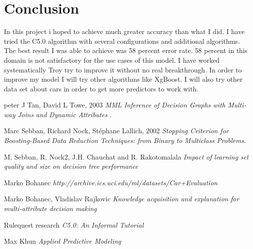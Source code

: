 \documentclass[a4paper, 12pt]{article}
\begin{document}
\section{Conclusion}
In this project i hoped to achieve much greater accuracy than what I did. I have tried the C5.0 algorithm with several configurations and additional algorithms. The best result I was able to achieve was 58 percent error rate. 58 percent in this domain is not satisfactory for the use cases of this model. I have worked systematically Troy try to improve it without no real breakthrough. In order to improve my model I will try other algorithms like XgBoost. I will also try other data set about cars in order to get more predictors to work with. 
\clearpage
\begin{thebibliography}{9}
peter J Tan, David L Towe, 2003
\textit{MML Inference of Decision Graphs with Multi-way Joins and Dynamic Attributes
}.

  Marc Sebban, Richard Nock, Stéphane Lallich, 2002
  \textit{Stopping Criterion for Boosting-Based Data Reduction Techniques: from Binary to Multiclass Problems}.

  M. Sebban, R. Nock2, J.H. Chauchat and R. Rakotomalala
  \textit{Impact of learning set quality and size on decision tree performance}

  Marko Bohanec
  \textit{http://archive.ics.uci.edu/ml/datasets/Car+Evaluation}

  Marko Bohanec, Vladislav Rajkovic
  \textit{Knowledge acquisition and explanation for multi-attribute decision making}

  Rulequest research
  \textit{C5.0: An Informal Tutorial}

  Max Khun
  \textit{Applied Predictive Modeling}


 
\end{thebibliography}
\end{document}
